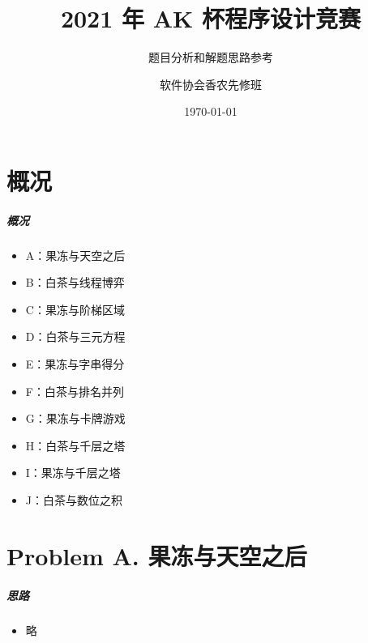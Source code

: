 \documentclass[
     aspectratio=169,                   %
]{beamer}
\begin{document}
    \title{2021 年 AK 杯程序设计竞赛}  %
    \subtitle{题目分析和解题思路参考}         %
    \author{软件协会香农先修班}                  %
    \date{\today}                          %
    \maketitle                             %

    
\part{概况}

\begin{frame}
	\frametitle{概况}
	\begin{itemize}
		\item A：果冻与天空之后
		\item B：白茶与线程博弈
		\item C：果冻与阶梯区域
		\item D：白茶与三元方程
		\item E：果冻与字串得分
		\item F：白茶与排名并列
		\item G：果冻与卡牌游戏
		\item H：白茶与千层之塔
		\item I：果冻与千层之塔
		\item J：白茶与数位之积
	\end{itemize}
\end{frame}


\part{Problem A. 果冻与天空之后}
\begin{frame}
	\frametitle{思路}
	\begin{itemize}
		\item 略
	\end{itemize}
\end{frame}
\end{document}

